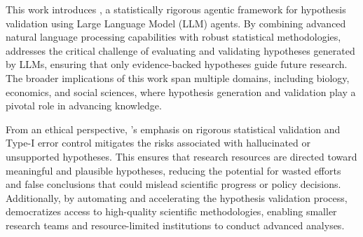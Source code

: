 This work introduces \mname, a statistically rigorous agentic framework for hypothesis validation using Large Language Model (LLM) agents. By combining advanced natural language processing capabilities with robust statistical methodologies, \mname addresses the critical challenge of evaluating and validating hypotheses generated by LLMs, ensuring that only evidence-backed hypotheses guide future research. The broader implications of this work span multiple domains, including biology, economics, and social sciences, where hypothesis generation and validation play a pivotal role in advancing knowledge.

From an ethical perspective, \mname's emphasis on rigorous statistical validation and Type-I error control mitigates the risks associated with hallucinated or unsupported hypotheses. This ensures that research resources are directed toward meaningful and plausible hypotheses, reducing the potential for wasted efforts and false conclusions that could mislead scientific progress or policy decisions. Additionally, by automating and accelerating the hypothesis validation process, \mname democratizes access to high-quality scientific methodologies, enabling smaller research teams and resource-limited institutions to conduct advanced analyses.